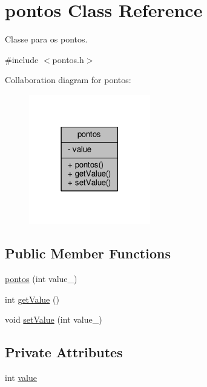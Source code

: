 \hypertarget{classpontos}{}\section{pontos Class Reference}
\label{classpontos}


Classe para os pontos.  




{\ttfamily \#include $<$pontos.\+h$>$}



Collaboration diagram for pontos\+:\nopagebreak
\begin{figure}[H]
\begin{center}
\leavevmode
\includegraphics[width=150pt]{classpontos__coll__graph}
\end{center}
\end{figure}
\subsection*{Public Member Functions}
\begin{DoxyCompactItemize}
\item 
\hyperlink{classpontos_ac2c939539723b5f20054239c0c78ef59}{pontos} (int value\+\_\+)
\item 
int \hyperlink{classpontos_a928ec19b58787b0dec93b801a9670070}{get\+Value} ()
\item 
void \hyperlink{classpontos_a75f82ace742aedeb18c05e4130f45951}{set\+Value} (int value\+\_\+)
\end{DoxyCompactItemize}
\subsection*{Private Attributes}
\begin{DoxyCompactItemize}
\item 
int \hyperlink{classpontos_a776f5643630f9aec273380a31d0e6e47}{value}
\end{DoxyCompactItemize}


